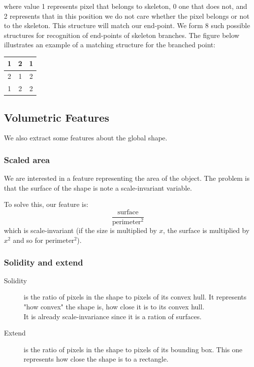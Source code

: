 \documentclass[12pt]{article}
\begin{document}
where value 1 represents pixel that belongs to skeleton, 0 one that does not, and 2 represents that in this position we do not care whether the pixel belongs or not to the skeleton. This structure will match our end-point. We form 8 such possible structures for recognition of end-points of skeleton branches. The figure below illustrates an example of a matching structure for the branched point:
 
\begin{center}
 	\begin{tabular}{| c | c | c |}
 		\hline
			1 & 2 & 1 \\ \hline
			2 & 1 & 2 \\ \hline
			1 & 2 & 2 \\ \hline
	\end{tabular}
\end{center}


\subsection{Volumetric Features}
We also extract some features about the global shape.

\subsubsection{Scaled area}

We are interested in a feature representing the area of the object. The problem is that the surface of the shape is note a scale-invariant variable.

To solve this, our feature is:
$$\frac{\text{surface}}{\text{perimeter}^2}$$
which is scale-invariant (if the size is multiplied by $x$, the surface is multiplied by $x^2$ and so for $\text{perimeter}^2$).

\subsubsection{Solidity and extend}
\begin{description}
  \item[Solidity] is the ratio of pixels in the shape to pixels of its convex hull. It represents "how convex" the shape is, how close it is to its convex hull.\\
  It is already scale-invariance since it is a ration of surfaces.
  \item[Extend] is the ratio of pixels in the shape to pixels of its bounding box. This one represents how close the shape is to a rectangle.
\end{description}
\end{document}
